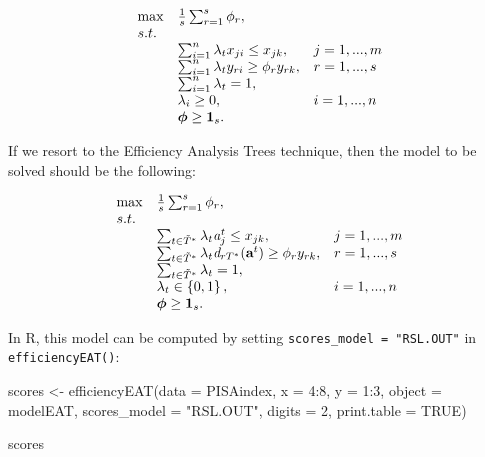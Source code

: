 \begin{equation} \label{(20)} 
\begin{array}{lllll} 
{} & {\max } & {\frac{1}{s} \sum_{r=1}^{s}\phi_{r},} & {} & {} \\ 
{} & {s.t.} & {} & {} & {} \\ 
{} & {} & {\sum_{i=1}^{n}\lambda_{t} x_{ji} \le x_{jk} ,} & {j=1,...,m} & {} \\ 
{} & {} & {\sum_{i=1}^{n}\lambda_{t} y_{ri} \ge \phi_{r} y_{rk} ,} & {r=1,...,s} & {} \\ 
{} & {} & {\sum_{i=1}^{n}\lambda_{t}=1,} & {} & {} \\ 
{} & {} & {\lambda_{i} \ge 0,} & {i=1,...,n} & {} \\ 
{} & {} & {{\it \boldsymbol{\phi}}\ge {\bf 1}_{s}.} 
\end{array}
\end{equation}

If we resort to the Efficiency Analysis Trees technique, then the model
to be solved should be the following:

\begin{equation} \label{(21)} 
\begin{array}{lllll} 
{} & {\max } & {\frac{1}{s} \sum_{r=1}^{s}\phi_{r},} & {} & {} \\ 
{} & {s.t.} & {} & {} & {} \\ 
{} & {} & {\sum_{t\in \tilde{T}^{*}}\lambda_{t} {\it a}_{j}^{t} \le x_{jk} ,} & {j=1,...,m} & {} \\ 
{} & {} & {\sum_{t\in \tilde{T}^{*}}\lambda_{t} {\it d}_{rT^{*}} ({\it \textbf{a}}^{t}) \ge \phi_{r} y_{rk} ,} & {r=1,...,s} & {} \\ 
{} & {} & {\sum_{t\in \tilde{T}^{*} }^{}\lambda_{t}=1,} & {} & {} \\ 
{} & {} & {\lambda_{t} \in \left\{0,1\right\},} & {i=1,...,n} & {} \\ 
{} & {} & {{\it \boldsymbol{\phi}}\ge {\bf 1}_{s}.} 
\end{array}
\end{equation}

In R, this model can be computed by setting
\texttt{scores\_model\ =\ "RSL.OUT"} in \texttt{efficiencyEAT()}:

\begin{Schunk}
\begin{Sinput}
scores <- efficiencyEAT(data = PISAindex, x = 4:8, y = 1:3, object = modelEAT, 
                        scores_model = "RSL.OUT", digits = 2,
                        print.table = TRUE)

scores %>% sample_n(3)
\end{Sinput}
\end{Schunk}

